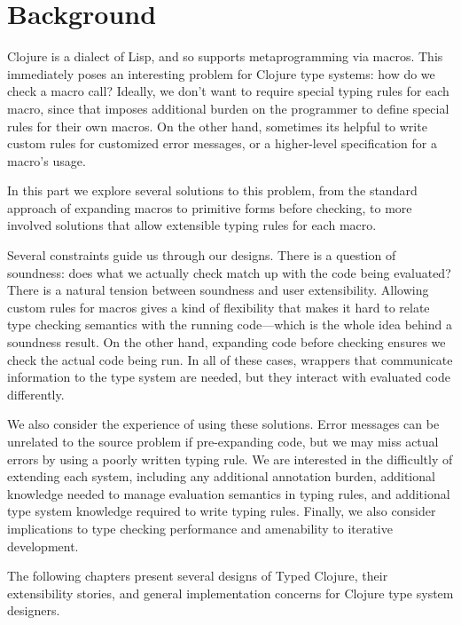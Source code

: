 \chapter{Background}

Clojure is a dialect of Lisp, and so supports metaprogramming
via macros.
This immediately poses an interesting problem for Clojure
type systems: how do we check a macro call?
Ideally, we don't want to require special typing rules for each
macro, since that imposes additional burden on the programmer
to define special rules for their own macros.
On the other hand, sometimes its helpful to write custom rules
for customized error messages, or a higher-level specification
for a macro's usage.

In this part we explore several solutions to this problem,
from the standard approach of expanding macros to
primitive forms before checking, to more involved solutions
that allow extensible typing rules for each macro.

Several constraints guide us through our designs.
There is a question of soundness: does what we actually
check match up with the code being evaluated?
There is a natural tension between soundness and user extensibility.
Allowing custom rules for macros gives a kind of flexibility
that makes it hard to relate type checking semantics with
the running code---which is the whole idea behind a soundness result.
On the other hand, expanding code before checking ensures
we check the actual code being run.
In all of these cases, wrappers that communicate information
to the type system are needed, but they interact
with evaluated code differently.

We also consider the experience of using these solutions.
Error messages can be unrelated to the source problem
if pre-expanding code, but we may miss actual errors
by using a poorly written typing rule.
We are interested in the difficultly of extending each system,
including any additional annotation burden,
additional knowledge needed to manage evaluation semantics
in typing rules, and additional type system knowledge required
to write typing rules. Finally, we also consider implications
to type checking performance and amenability to iterative development.

The following chapters present several designs of Typed Clojure,
their extensibility stories, and general implementation concerns for
Clojure type system designers.


